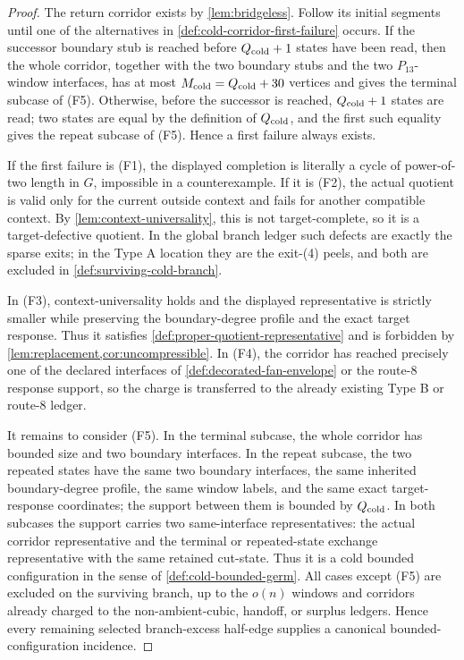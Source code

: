 \documentclass[11pt]{article}
\begin{document}
\begin{proof}
The return corridor exists by \cref{lem:bridgeless}.  Follow its initial
segments until one of the alternatives in
\cref{def:cold-corridor-first-failure} occurs.  If the successor boundary stub
is reached before \(Q_{\rm cold}+1\) states have been read, then the whole
corridor, together with the two boundary stubs and the two \(P_{13}\)-window
interfaces, has at most \(M_{\rm cold}=Q_{\rm cold}+30\) vertices and gives the
terminal subcase of (F5).  Otherwise, before the successor is reached,
\(Q_{\rm cold}+1\) states are read; two states are equal by the definition of
\(Q_{\rm cold}\), and the first such equality gives the repeat subcase of
(F5).  Hence a first failure always exists.

If the first failure is (F1), the displayed completion is literally a cycle of
power-of-two length in \(G\), impossible in a counterexample.  If it is (F2),
the actual quotient is valid only for the current outside context and fails
for another compatible context.  By \cref{lem:context-universality}, this is
not target-complete, so it is a target-defective quotient.  In the global
branch ledger such defects are exactly the sparse exits; in the Type A
location they are the exit-\textup{(4)} peels, and both are excluded in
\cref{def:surviving-cold-branch}.

In (F3), context-universality holds and the displayed representative is
strictly smaller while preserving the boundary-degree profile and the exact
target response.  Thus it satisfies
\cref{def:proper-quotient-representative} and is forbidden by
\cref{lem:replacement,cor:uncompressible}.  In (F4), the corridor has reached
precisely one of the declared interfaces of
\cref{def:decorated-fan-envelope} or the route-8 response support, so the
charge is transferred to the already existing Type B or route-8 ledger.

It remains to consider (F5).  In the terminal subcase, the whole corridor has
bounded size and two boundary interfaces.  In the repeat subcase, the two
repeated states have the same two boundary interfaces, the same inherited
boundary-degree profile, the same window labels, and the same exact
target-response coordinates; the support between them is bounded by
\(Q_{\rm cold}\).  In both subcases the support carries two same-interface
representatives: the actual corridor representative and the terminal or
repeated-state exchange representative with the same retained cut-state.  Thus
it is a cold bounded configuration in the sense of \cref{def:cold-bounded-germ}.  All
cases except (F5) are excluded on the surviving branch, up to the \(o(n)\)
windows and corridors already charged to the non-ambient-cubic, handoff, or
surplus ledgers.  Hence every remaining selected branch-excess half-edge
supplies a canonical bounded-configuration incidence.
\end{proof}
\end{document}
